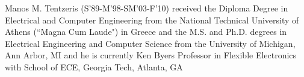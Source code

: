 \documentclass[journal]{IEEEtran}
\begin{document}
\begin{IEEEbiography}
{Manos M. Tentzeris}  (S'89-M'98-SM'03-F'10) received the Diploma Degree in Electrical and Computer Engineering from the National Technical University of Athens (``Magna Cum Laude") in Greece and the M.S. and Ph.D. degrees in Electrical Engineering and Computer Science from the University of Michigan, Ann Arbor, MI and he is currently Ken Byers Professor in Flexible Electronics with School of ECE, Georgia Tech, Atlanta, GA


\end{IEEEbiography}
\end{document}
